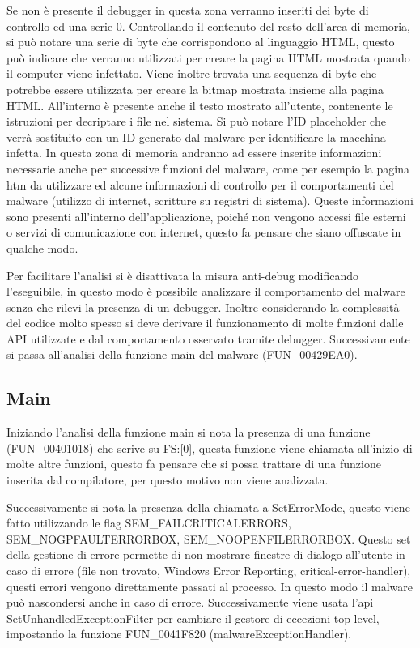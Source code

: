 \documentclass[a4paper,12pt]{article}
\begin{document}
Se non è presente il debugger in questa zona verranno inseriti dei byte di controllo ed una serie 0. Controllando il contenuto del resto dell'area di memoria, si può notare una serie di byte che corrispondono al linguaggio HTML, questo può indicare che verranno utilizzati per creare la pagina HTML mostrata quando il computer viene infettato. Viene inoltre trovata una sequenza di byte che potrebbe essere utilizzata per creare la bitmap mostrata insieme alla pagina HTML. All'interno è presente anche il testo mostrato all'utente, contenente le istruzioni per decriptare i file nel sistema. Si può notare l'ID placeholder che verrà sostituito con un ID generato dal malware per identificare la macchina infetta. 
In questa zona di memoria andranno ad essere inserite informazioni necessarie anche per successive funzioni del malware, come per esempio la pagina htm da utilizzare ed alcune informazioni di controllo per il comportamenti del malware (utilizzo di internet, scritture su registri di sistema).  Queste informazioni sono presenti all'interno dell'applicazione, poiché non vengono accessi file esterni o servizi di comunicazione con internet, questo fa pensare che siano offuscate in qualche modo.

Per facilitare l'analisi si è disattivata la misura anti-debug modificando l'eseguibile, in questo modo è possibile analizzare il comportamento del malware senza che rilevi la presenza di un debugger. Inoltre considerando la complessità del codice molto spesso si deve derivare il funzionamento di molte funzioni dalle API utilizzate e dal comportamento osservato tramite debugger.
Successivamente si passa all'analisi della funzione main del malware (FUN\_00429EA0).

\subsection{Main}
Iniziando l'analisi della funzione main si nota la presenza di una funzione (FUN\_00401018) che scrive su FS:[0], questa funzione viene chiamata all'inizio di molte altre funzioni, questo fa pensare che si possa trattare di una funzione inserita dal compilatore, per questo motivo non viene analizzata.

Successivamente si nota la presenza della chiamata a SetErrorMode, questo viene fatto utilizzando le flag SEM\_FAILCRITICALERRORS,\\ SEM\_NOGPFAULTERRORBOX, SEM\_NOOPENFILERRORBOX. Questo set della gestione di errore permette di non mostrare finestre di dialogo all'utente in caso di errore (file non trovato, Windows Error Reporting, critical-error-handler), questi errori vengono direttamente passati al processo. In questo modo il malware può nascondersi anche in caso di errore. Successivamente viene usata l'api SetUnhandledExceptionFilter per cambiare il gestore di eccezioni top-level, impostando la funzione FUN\_0041F820 (malwareExceptionHandler). 
\end{document}
